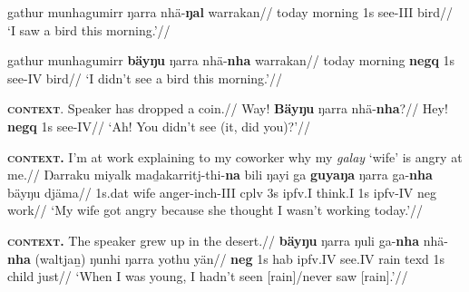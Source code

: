 \a\begingl\gla gathur munhagumirr ŋarra nhä-\textbf{ŋal} warrakan//
\glb today morning 1s see-\gls{III} bird//
\glft`I saw a bird this morning.'\trailingcitation{[FW 20180802]}//\endgl


\a\begingl\gla gathur munhagumirr \textbf{bäyŋu} ŋarra nhä-\textbf{nha} warrakan//
\glb today morning \textbf{\gls{negq}} 1s see-\gls{IV} bird//
\glft`I didn't see a bird this morning.'\trailingcitation{[FW 20180802]}//\endgl

\a\begingl\glpreamble \textsc{\textbf{context}.} Speaker has dropped a coin.//
\gla Way! \textbf{Bäyŋu} ŋarra nhä-\textbf{nha}?//
\glb Hey! \textbf{\gls{negq}} 1s see-\gls{IV}//
\glft`Ah! You didn't see (it, did you)?'\trailingcitation{[AW 20180830]}//\endgl


\a\begingl\glpreamble\textbf{\textsc{context.}} I'm at work explaining to my coworker why my \textit{galay} `wife' is angry at me.//
\gla Ŋarraku miyalk maḏakarritj-thi-\textbf{na} bili ŋayi ga \textbf{guyaŋa} ŋarra ga-\textbf{nha} bäyŋu djäma//
\glb 1s.\gls{dat} wife anger-\gls{inch}-\gls{III} \gls{cplv} 3s \gls{ipfv}.\gls{I} think.\gls{I} 1s \gls{ipfv}-\gls{IV} \gls{neg} work//
\glft`My wife got angry because she thought I wasn't working today.'\trailingcitation{[DhG~20190417]}//\endgl

\a\begingl\glpreamble \textbf{\textsc{context.}} The speaker grew up in the desert.//
\gla \textbf{bäyŋu} ŋarra ŋuli ga-\textbf{nha} nhä-\textbf{nha} (waltjaṉ) ŋunhi ŋarra yothu yän//
\glb \textbf{\gls{neg}} 1s 	\gls{hab} \gls{ipfv}.\gls{IV} see.\gls{IV} rain \gls{texd} 1s child just//
\glft`When I was young, I hadn't seen [rain]/never saw [rain].'\trailingcitation{[AW~20190501]}//\endgl\xe


